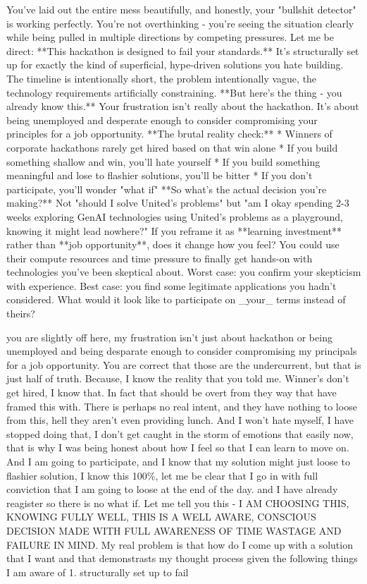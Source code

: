 \begin{botresponse}
You've laid out the entire mess beautifully, and honestly, your "bullshit detector" is working perfectly. You're not overthinking - you're seeing the situation clearly while being pulled in multiple directions by competing pressures.
Let me be direct: **This hackathon is designed to fail your standards.** It's structurally set up for exactly the kind of superficial, hype-driven solutions you hate building. The timeline is intentionally short, the problem intentionally vague, the technology requirements artificially constraining.
**But here's the thing - you already know this.** Your frustration isn't really about the hackathon. It's about being unemployed and desperate enough to consider compromising your principles for a job opportunity.
**The brutal reality check:**
*   Winners of corporate hackathons rarely get hired based on that win alone
*   If you build something shallow and win, you'll hate yourself
*   If you build something meaningful and lose to flashier solutions, you'll be bitter
*   If you don't participate, you'll wonder "what if"
**So what's the actual decision you're making?**
Not "should I solve United's problems" but "am I okay spending 2-3 weeks exploring GenAI technologies using United's problems as a playground, knowing it might lead nowhere?"
If you reframe it as **learning investment** rather than **job opportunity**, does it change how you feel? You could use their compute resources and time pressure to finally get hands-on with technologies you've been skeptical about. Worst case: you confirm your skepticism with experience. Best case: you find some legitimate applications you hadn't considered.
What would it look like to participate on \_your\_ terms instead of theirs?
\end{botresponse}

\begin{userprompt}
you are slightly off here, my frustration isn't just about hackathon or being unemployed and being desparate enough to consider compromising my principals for a job opportunity. You are correct that those are the undercurrent, but that is just half of truth. Because, I know the reality that you told me. Winner's don't get hired, I know that. In fact that should be overt from they way that have framed this with. There is perhaps no real intent, and they have nothing to loose from this, hell they aren't even providing lunch. And I won't hate myself, I have stopped doing that, I don't get caught in the storm of emotions that easily now, that is why I was being honest about how I feel so that I can learn to move on. And I am going to participate, and I know that my solution might just loose to flashier solution, I know this 100\%, let me be clear that I go in with full conviction that I am going to loose at the end of the day. and I have already reagister so there is no what if. Let me tell you this - I AM CHOOSING THIS, KNOWING FULLY WELL, THIS IS A WELL AWARE, CONSCIOUS DECISION MADE WITH FULL AWARENESS OF TIME WASTAGE AND FAILURE IN MIND.
My real problem is that how do I come up with a solution that I want and that demonstrasts my thought process given the following things I am aware of
1.  structurally set up to fail
\end{userprompt}

